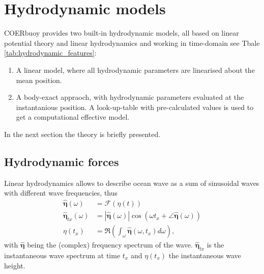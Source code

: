 \documentclass[oneside,10pt,a4paper]{book}
\begin{document}
\chapter{Hydrodynamic models}
COERbuoy provides two built-in hydrodynamic models, all based on linear potential theory and linear hydrodynamics and working in time-domain see Tbale \ref{tab:hydrodynamic_features}:
\begin{enumerate}
	\item A linear model, where all hydrodynamic parameters are linearised about the mean position.
	\item A body-exact appraoch, with hydrodynamic parameters evaluated at the instantanious position. A look-up-table with pre-calculated values is used to get a computational effective model.
\end{enumerate} 
In the next section the theory is briefly presented.
\section{Hydrodynamic forces}\label{ssec:hydrodynamicForces}
Linear hydrodynamics allows to describe ocean wave as a sum of sinusoidal waves with different wave frequencies, thus 
\begin{equation}
	\begin{split}\label{eq:FrequencyTime}
		\pmb{\hat{\eta}}(\omega)&=\mathcal{F}(\eta(t))\\
		\pmb{\hat{\eta}}_{tx}(\omega)&=|\pmb{\hat{\eta}}(\omega)| \cos(\omega t_x + \angle\pmb{\hat{\eta}}(\omega))\\
		\eta(t_x) &=\Re\left(\int_{\omega}\pmb{\hat{\eta}}(\omega,t_x)d\omega\right)\text{,}
	\end{split}
\end{equation}
with $\hat{\pmb{\eta}}$ being the (complex) frequency spectrum of the wave. $\hat{\pmb{\eta}}_{tx}$ is the instantaneous wave spectrum at time $t_x$ and $\eta(t_x)$ the instantaneous wave height.
\end{document}

